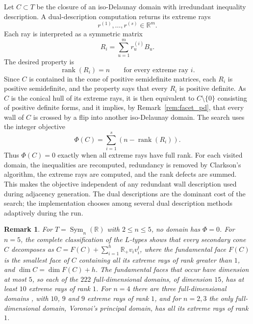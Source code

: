 \documentclass{amsart}
\newtheorem{remark}{Remark}
\newcommand{\Sym}{\operatorname{Sym}}
\newcommand{\rank}{\operatorname{rank}}
\newcommand{\RR}{\mathbb{R}}
\begin{document}
Let \(C\subset T\) be the closure of an iso-Delaunay domain with irredundant
inequality description.  A dual-description computation returns its extreme
rays
\begin{equation}
  r^{(1)},\ldots,r^{(s)}\in \RR^m .
\end{equation}
Each ray is interpreted as a symmetric matrix
\begin{equation}
  R_i=\sum_{u=1}^{m} r^{(i)}_u B_u .
\end{equation}
The desired property is
\begin{equation}
  \rank(R_i)=n \qquad \text{for every extreme ray } i .
\end{equation}
Since \(C\) is contained in the cone of positive semidefinite matrices, each
\(R_i\) is positive semidefinite, and the property says that every \(R_i\) is
positive definite.  As \(C\) is the conical hull of its extreme rays, it is
then equivalent to \(C\setminus\{0\}\) consisting of positive definite forms,
and it implies, by Remark~\ref{rem:facet_pd}, that every wall of \(C\) is
crossed by a flip into another iso-Delaunay domain.
The search uses the integer objective
\begin{equation}
  \Phi(C)=\sum_{i=1}^{s} (n-\rank(R_i)).
\end{equation}
Thus \(\Phi(C)=0\) exactly when all extreme rays have full rank.  For each
visited domain, the inequalities are recomputed, redundancy is removed by
Clarkson's algorithm, the extreme rays are computed, and the rank defects are
summed.  This makes the objective independent of any redundant wall
description used during adjacency generation.  The dual descriptions are the
dominant cost of the search; the implementation chooses among several dual
description methods adaptively during the run.

\begin{remark}\label{rem:small_n}
For \(T=\Sym_n(\RR)\) with \(2\leq n\leq 5\), no domain has
\(\Phi=0\).  For \(n=5\), the
complete classification of the \(L\)-types
\cite{DutourSikiricGarberSchurmannWaldmann2016} shows that every secondary cone \(C\) decomposes as
\(C=F(C)+\sum_{i=1}^{h}\RR_{+}v_iv_i^{t}\), where the fundamental face
\(F(C)\) is the smallest face of \(C\) containing all its extreme rays of
rank greater than \(1\), and \(\dim C=\dim F(C)+h\).  The fundamental faces
that occur have dimension at most \(5\), so each of the \(222\)
full-dimensional domains, of dimension \(15\), has at least \(10\) extreme
rays of rank \(1\).  For \(n=4\) there are three full-dimensional domains
\cite{Voronoi1908}, with \(10\), \(9\) and \(9\) extreme rays of rank
\(1\), and for \(n=2,3\) the only full-dimensional domain, Voronoi's
principal domain, has all its extreme rays of rank \(1\).
\end{remark}
\end{document}

